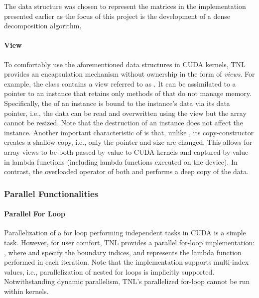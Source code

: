 The  data structure was chosen to represent the matrices in the implementation presented earlier as the focus of this project is the development of a dense decomposition algorithm.

\paragraph{View} To comfortably use the aforementioned data structures in CUDA kernels, TNL provides an encapsulation mechanism without ownership in the form of \textit{views}. For example, the  class contains a view referred to as . It can be assimilated to a pointer to an  instance that retains only methods of  that do not manage memory. Specifically, the  of an  instance is bound to the  instance's data via its data pointer, i.e., the data can be read and overwritten using the view but the array cannot be resized. Note that the destruction of an  instance does not affect the  instance. Another important characteristic of  is that, unlike , its copy-constructor creates a shallow copy, i.e., only the pointer and size are changed. This allows for array views to be both passed by value to CUDA kernels and captured by value in lambda functions (including lambda functions executed on the device). In contrast, the overloaded operator  of both  and  performs a deep copy of the data.

\subsubsection{Parallel Functionalities}\label{Subsection:implementation->libraries-used->TNL->parallel-functionalities}

\paragraph{Parallel For Loop} Parallelization of a for loop performing independent tasks in CUDA is a simple task. However, for user comfort, TNL provides a parallel for-loop implementation: , where  and  specify the boundary indices, and  represents the lambda function performed in each iteration. Note that the implementation supports multi-index values, i.e., parallelization of nested for loops is implicitly supported. Notwithstanding dynamic parallelism, TNL's parallelized for-loop cannot be run within kernels.


